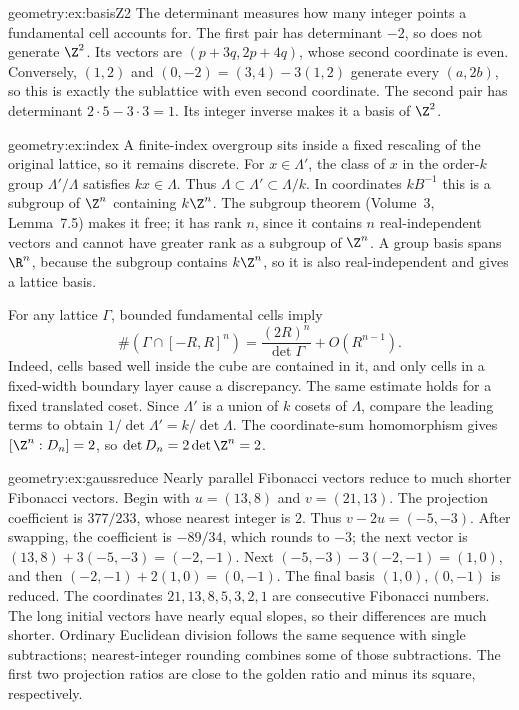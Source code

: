 \begin{solution}{geometry:ex:basisZ2}
\idea The determinant measures how many integer points a fundamental cell
accounts for.
\writeup The first pair has determinant $-2$, so does not generate
$\Z^2$. Its vectors are $(p+3q,2p+4q)$, whose second coordinate is
even. Conversely, $(1,2)$ and $(0,-2)=(3,4)-3(1,2)$ generate every
$(a,2b)$, so this is exactly the sublattice with even second coordinate.
The second pair has determinant $2\cdot5-3\cdot3=1$.
Its integer inverse makes it a basis of $\Z^2$.
\end{solution}
\begin{solution}{geometry:ex:index}
\idea A finite-index overgroup sits inside a fixed rescaling of the original
lattice, so it remains discrete.
\writeup For $x\in\Lambda'$, the class of $x$ in the order-$k$ group
$\Lambda'/\Lambda$ satisfies $kx\in\Lambda$.
Thus $\Lambda\subset\Lambda'\subset\Lambda/k$.
In coordinates $kB^{-1}$ this is a subgroup of $\Z^n$ containing
$k\Z^n$. The subgroup theorem (Volume~3, Lemma~7.5) makes it free;
it has rank $n$, since it contains $n$ real-independent vectors and
cannot have greater rank as a subgroup of $\Z^n$.
A group basis spans $\R^n$, because the subgroup contains $k\Z^n$,
so it is also real-independent and gives a lattice basis.

For any lattice $\Gamma$, bounded fundamental cells imply
\[
 \#(\Gamma\cap[-R,R]^n)
 =\frac{(2R)^n}{\det\Gamma}+O(R^{n-1}).
\]
Indeed, cells based well inside the cube are contained in it, and only
cells in a fixed-width boundary layer cause a discrepancy.
The same estimate holds for a fixed translated coset.
Since $\Lambda'$ is a union of $k$ cosets of $\Lambda$, compare the
leading terms to obtain $1/\det\Lambda'=k/\det\Lambda$.
The coordinate-sum homomorphism gives $[\Z^n:D_n]=2$, so
$\det D_n=2\det\Z^n=2$.
\end{solution}
\begin{solution}{geometry:ex:gaussreduce}
\idea Nearly parallel Fibonacci vectors reduce to much shorter Fibonacci
vectors.
\writeup Begin with $u=(13,8)$ and $v=(21,13)$.
The projection coefficient is $377/233$, whose nearest integer is $2$.
Thus $v-2u=(-5,-3)$. After swapping, the coefficient is
$-89/34$, which rounds to $-3$; the next vector is
$(13,8)+3(-5,-3)=(-2,-1)$.
Next $(-5,-3)-3(-2,-1)=(1,0)$, and then
$(-2,-1)+2(1,0)=(0,-1)$.
The final basis $(1,0),(0,-1)$ is reduced.
The coordinates $21,13,8,5,3,2,1$ are consecutive Fibonacci numbers.
The long initial vectors have nearly equal slopes, so their differences
are much shorter. Ordinary Euclidean division follows the same sequence
with single subtractions; nearest-integer rounding combines some of those
subtractions. The first two projection ratios are close to the golden
ratio and minus its square, respectively.
\end{solution}

